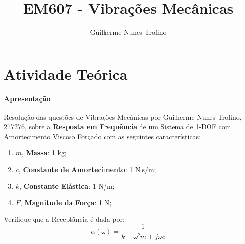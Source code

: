 \documentclass{article}
\title{EM607 - Vibrações Mecânicas}
\author{Guilherme Nunes Trofino}
\begin{document}
    \maketitle
\newpage

\section{Atividade Teórica}
\paragraph{Apresentação}Resolução das questões de Vibrações Mecânicas por Guilherme Nunes Trofino, 217276, sobre a \textbf{Resposta em Frequência} de um Sistema de 1-DOF com Amortecimento Viscoso Forçado com as seguintes características:
\begin{enumerate}
    \item $m$, \textbf{Massa}: 1 kg;
    \item $c$, \textbf{Constante de Amortecimento}: 1 N.s/m;
    \item $k$, \textbf{Constante Elástica}: 1 N/m;
    \item $F$, \textbf{Magnitude da Força}: 1 N;
\end{enumerate}
\begin{exercise}\label{ex1}
    Verifique que a Receptância é dada por:
    \begin{equation}
        \alpha (\omega) = \frac{1}{k - \omega^2 m + j\omega c}
    \end{equation}
\end{exercise}
\end{document}

